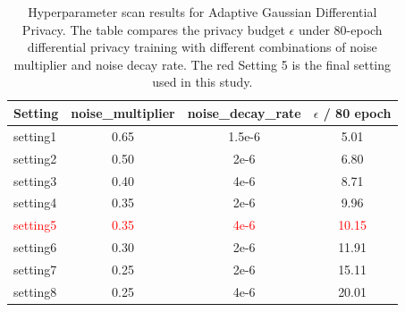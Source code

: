 \begin{table}[!htb]
\centering
\caption{Hyperparameter scan results for Adaptive Gaussian Differential Privacy. The table compares the privacy budget $\epsilon$ under 80-epoch differential privacy training with different combinations of noise multiplier and noise decay rate. The red Setting 5 is the final setting used in this study.}
\label{tab:privacy-scan}
\begin{tabular}{lccc}
\toprule
Setting & noise\_multiplier & noise\_decay\_rate & $\epsilon$ / 80 epoch \\
\midrule
setting1 & 0.65 & 1.5e-6 & 5.01 \\
setting2 & 0.50 & 2e-6 & 6.80 \\
setting3 & 0.40 & 4e-6 & 8.71 \\
setting4 & 0.35 & 2e-6 & 9.96 \\
\textcolor{red}{setting5} & \textcolor{red}{0.35} & \textcolor{red}{4e-6} & \textcolor{red}{10.15} \\
setting6 & 0.30 & 2e-6 & 11.91 \\
setting7 & 0.25 & 2e-6 & 15.11 \\
setting8 & 0.25 & 4e-6 & 20.01 \\
\bottomrule
\end{tabular}
\end{table}
